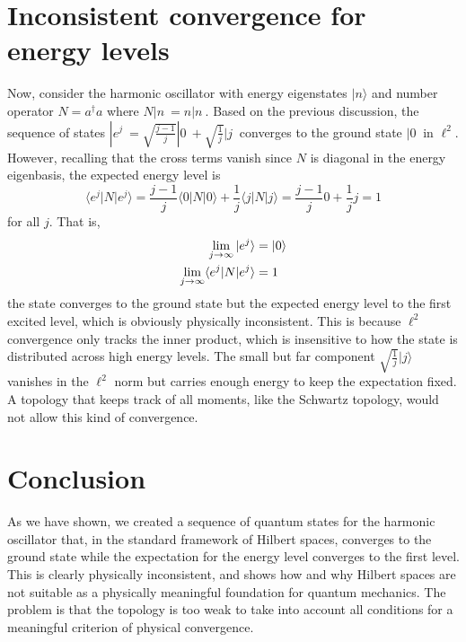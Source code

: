 \documentclass{techbrief}
\begin{document}
\section{Inconsistent convergence for energy levels}

Now, consider the harmonic oscillator with energy eigenstates $|n\rangle$ and number operator $N = a^\dagger a$ where $N|n\> = n|n\>$. Based on the previous discussion, the sequence of states $|e^j\> = \sqrt{\frac{j-1}{j}}|0\> + \sqrt{\frac{1}{j}}|j\>$ converges to the ground state $|0\>$ in $\ell^2$. However, recalling that the cross terms vanish since $N$ is diagonal in the energy eigenbasis, the expected energy level is
\begin{equation}
	\langle e^j|N|e^j\rangle = \frac{j-1}{j}\langle 0|N|0\rangle + \frac{1}{j}\langle j|N|j\rangle = \frac{j-1}{j}0 + \frac{1}{j}j = 1
\end{equation}
for all $j$. That is,
\begin{equation}
	\begin{aligned}
		\lim_{j \to \infty} |e^j\rangle &= |0\rangle \\
		\lim_{j \to \infty} \langle e^j|N|e^j\rangle  &= 1
	\end{aligned}
\end{equation}
the state converges to the ground state but the expected energy level to the first excited level, which is obviously physically inconsistent. This is because $\ell^2$ convergence only tracks the inner product, which is insensitive to how the state is distributed across high energy levels. The small but far component $\sqrt{\frac{1}{j}}|j\rangle$ vanishes in the $\ell^2$ norm but carries enough energy to keep the expectation fixed. A topology that keeps track of all moments, like the Schwartz topology, would not allow this kind of convergence.

\section{Conclusion}

As we have shown, we created a sequence of quantum states for the harmonic oscillator that, in the standard framework of Hilbert spaces, converges to the ground state while the expectation for the energy level converges to the first level. This is clearly physically inconsistent, and shows how and why Hilbert spaces are not suitable as a physically meaningful foundation for quantum mechanics. The problem is that the topology is too weak to take into account all conditions for a meaningful criterion of physical convergence.
\end{document}
